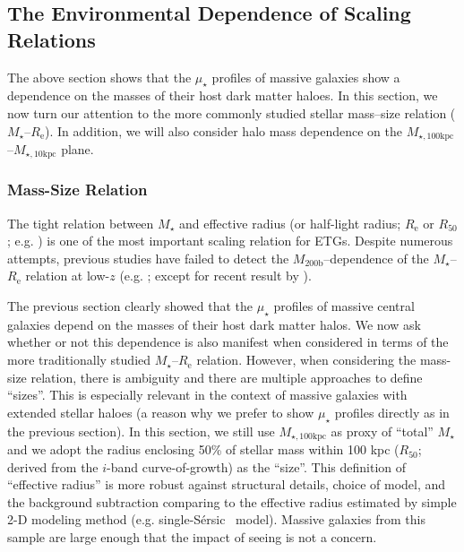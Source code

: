 \documentclass[a4paper,fleqn,usenatbib]{mnras}
\def\ser{{S\'{e}rsic\ }}
\def\mstar{{$M_{\star}$}}
\def\mhalo{{$M_{\mathrm{200b}}$}}
\def\minn{{$M_{\star,10\mathrm{kpc}}$}}
\def\mtot{{$M_{\star,100\mathrm{kpc}}$}}
\def\mden{{$\mu_{\star}$}}
\begin{document}
\subsection{The Environmental Dependence of Scaling Relations}
    \label{ssec:scaling}
    
    The above section shows that the \mden{} profiles of massive galaxies show a 
    dependence on the masses of their host dark matter haloes. 
    In this section, we now turn our attention to the more commonly studied stellar 
    mass--size relation (\mstar{}--$R_{\mathrm{e}}$). 
    In addition, we will also consider halo mass dependence on the 
    \mtot{}--\minn{} plane. 
    
\subsubsection{Mass-Size Relation}
    \label{sssec:mass_size}
    
    The tight relation between \mstar{} and effective radius (or half-light radius; 
    $R_{\mathrm{e}}$ or $R_{\mathrm{50}}$; e.g. \citealt{Shankar2013, Leja2013, 
    vdWel2014}) is one of the most important scaling relation for ETGs. 
    Despite numerous attempts, previous studies have failed to detect the 
    \mhalo{}--dependence of the \mstar{}--$R_{\mathrm{e}}$ relation at low-$z$ 
    (e.g. \citealt{Weinmann2009, Nair2010, HCompany13, Cerbrian2014}; 
    except for recent result by \citealt{Yoon2017}). 
    
    The previous section clearly showed that the \mden{} profiles of massive central 
    galaxies depend on the masses of their host dark matter halos. 
    We now ask whether or not this dependence is also manifest when considered in 
    terms of the more traditionally studied \mstar{}--$R_{\mathrm{e}}$ relation. 
    However, when considering the mass-size relation, there is ambiguity and there are
    multiple approaches to define ``sizes''. 
    This is especially relevant in the context of massive galaxies with extended 
    stellar haloes (a reason why we prefer to show \mden{} profiles directly as in 
    the previous section). 
    In this section, we still use \mtot{} as proxy of ``total'' \mstar{} and we adopt 
    the radius enclosing 50\% of stellar mass within 100 kpc ($R_{\mathrm{50}}$; 
    derived from the $i$-band curve-of-growth) as the ``size''. 
    This definition of ``effective radius'' is more robust against structural details, 
    choice of model, and the background subtraction comparing to the effective radius 
    estimated by simple 2-D modeling method (e.g. single-\ser{} model). 
    Massive galaxies from this sample are large enough that the impact of seeing is 
    not a concern.
    
\end{document}

